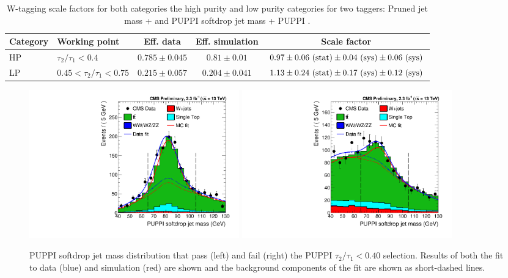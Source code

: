 \begin{table}[h!]
   \centering
   \footnotesize
   \begin{tabular}{|l|l|c|c|c|}
   \hline
   Category & Working point & Eff. data & Eff. simulation & Scale factor\\
   \hline
   HP& $\tau_2 / \tau_1 < 0.4$         & $0.785 \pm 0.045 $& $0.81 \pm 0.01$   &$0.97 \pm 0.06~\rm{(stat)} \pm 0.04~\rm{(sys)} \pm 0.06~\rm{(sys)}$\\
   LP& $0.45 < \tau_2 / \tau_1 < 0.75$ & $0.215 \pm 0.057 $& $0.204 \pm 0.041$ &$1.13 \pm 0.24~\rm{(stat)} \pm 0.17~\rm{(sys)}  \pm 0.12~\rm{(sys)}$\\
   \hline
   \end{tabular}
   \caption{W-tagging scale factors for both categories the high purity and low purity categories for two taggers: Pruned jet mass + \nsubj and PUPPI softdrop jet mass + PUPPI \nsubj. }
   \label{tab:app:WtagSFs}
\end{table}


\begin{figure}[h!]
\centering
\includegraphics[width=0.44\textwidth]{figures/vtagging/AN-16-215/_HP0v40powheg_76X_PuppiSD_em_pTbin_200_5000.pdf}
\includegraphics[width=0.44\textwidth]{figures/vtagging/AN-16-215/_HP0v40powheg_76X_PuppiSD_em_fail_pTbin_200_5000.pdf}\\
\caption{PUPPI softdrop jet mass distribution that pass (left) and fail (right) the PUPPI $\tau_2 / \tau_1 < 0.40$ selection. Results of both the fit to data (blue) and simulation (red) are shown and the background components of the fit are shown as short-dashed lines.}
\label{fig:appI:simfit}
\end{figure}

